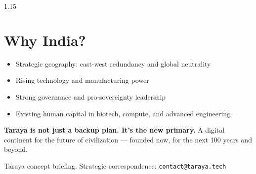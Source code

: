 \documentclass[12pt]{article}
\begin{document}
\begin{spacing}{1.15}
\section*{Why India?}
\begin{itemize}
  \item Strategic geography: east-west redundancy and global neutrality
  \item Rising technology and manufacturing power
  \item Strong governance and pro-sovereignty leadership
  \item Existing human capital in biotech, compute, and advanced engineering
\end{itemize}

\vspace{1em}
\noindent
\textbf{Taraya is not just a backup plan. It's the new primary.}  
A digital continent for the future of civilization — founded now, for the next 100 years and beyond.

\vspace{1.5em}
\begin{flushright}
{\footnotesize Taraya concept briefing. Strategic correspondence: \texttt{contact@taraya.tech}}
\end{flushright}

\end{spacing}
\end{document}
